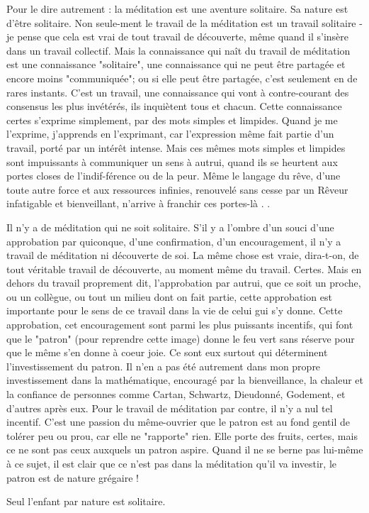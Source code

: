 Pour le dire autrement : la méditation est une aventure solitaire. Sa nature est d'être solitaire. Non seule-ment le travail de la méditation est un travail solitaire - je pense que cela est vrai de tout travail de découverte, même quand il s'insère dans un travail collectif. Mais la connaissance qui naît du travail de méditation est une connaissance "solitaire", une connaissance qui ne peut être partagée et encore moins "communiquée"; ou si elle peut être partagée, c'est seulement en de rares instants. C'est un travail, une connaissance qui vont à contre-courant des consensus les plus invétérés, ils inquiètent tous et chacun. Cette connaissance certes s'exprime simplement, par des mots simples et limpides. Quand je me l'exprime, j'apprends en l'exprimant, car l'expression même fait partie d'un travail, porté par un intérêt intense. Mais ces mêmes mots simples et limpides sont impuissants à communiquer un sens à autrui, quand ils se heurtent aux portes closes de l'indif-férence ou de la peur. Même le langage du rêve, d'une toute autre force et aux ressources infinies, renouvelé sans cesse par un Rêveur infatigable et bienveillant, n'arrive à franchir ces portes-là . .

Il n'y a de méditation qui ne soit solitaire. S'il y a l'ombre d'un souci d'une approbation par quiconque, d'une confirmation, d'un encouragement, il n'y a travail de méditation ni découverte de soi. La même chose est vraie, dira-t-on, de tout véritable travail de découverte, au moment même du travail. Certes. Mais en dehors du travail proprement dit, l'approbation par autrui, que ce soit un proche, ou un collègue, ou tout un milieu dont on fait partie, cette approbation est importante pour le sens de ce travail dans la vie de celui gui s'y donne. Cette approbation, cet encouragement sont parmi les plus puissants incentifs, qui font que le "patron" (pour reprendre cette image) donne le feu vert sans réserve pour que le même s'en donne à coeur joie. Ce sont eux surtout qui déterminent l'investissement du patron. Il n'en a pas été autrement dans mon propre investissement dans la mathématique, encouragé par la bienveillance, la chaleur et la confiance de personnes comme Cartan, Schwartz, Dieudonné, Godement, et d'autres après eux. Pour le travail de méditation par contre, il n'y a nul tel incentif. C'est une passion du même-ouvrier que le patron est au fond gentil de tolérer peu ou prou, car elle ne "rapporte" rien. Elle porte des fruits, certes, mais ce ne sont pas ceux auxquels un patron aspire. Quand il ne se berne pas lui-même à ce sujet, il est clair que ce n'est pas dans la méditation qu'il va investir, le patron est de nature grégaire !

Seul l'enfant par nature est solitaire.